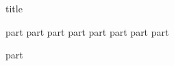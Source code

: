 \documentclass[paper=216.35mm:303.35mm,pagesize=pdftex,final,headinclude=false,footinclude=false,twoside,sfdefaults=false]{kaobook}
\begin{document}
    {title}
    \mainmatter

    {part}
    {part}
    {part}
    {part}
    {part}
    {part}
    {part}
    {part}


    \backmatter
    {part}
\end{document}
